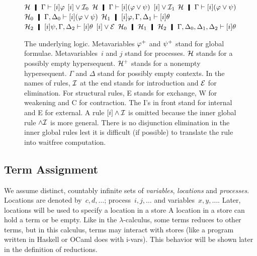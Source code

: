 \begin{figure}
  \UnaryRule
   {$\hyper\hmid\Gamma\vdash[i]\varphi$}
   {$[i]\vee\mathcal I_0$}
   {$\hyper\hmid\Gamma\vdash[i](\varphi\vee\psi)$}
   \hfill
  \UnaryRule{$\hyper\hmid\Gamma\vdash[i]\psi$}
   {$[i]\vee\mathcal I_1$}
   {$\hyper\hmid\Gamma\vdash[i](\varphi\vee\psi)$}
   \TrinaryRule
   {$\hyper_0\hmid\G,\D_0\vdash[i](\phi\vee\psi)$}
   {$\hyper_1\hmid[i]\varphi, \G,\D_1\vdash[i]\theta$}
   {$\hyper_2\hmid[i]\psi,    \G,\D_2\vdash[i]\theta$}
   {$[i]\vee\mathcal E$}
   {$\hyper_0\hmid\hyper_1\hmid\hyper_2\hmid
 \G,\D_0,\D_1,\D_2\vdash[i]\theta$}
\caption[The underlying logic of \lgd.]
 {The underlying logic.
 Metavariables ${\varphi}^+$ and ${\psi}^+$ stand for global formulae.
 Metavariables~$i$ and $j$ stand for processes.
 $\mathcal{H}$ stands for a possibly empty hypersequent.
 $\mathcal{H}^+$ stands for a nonempty hypersequent.
 $\Gamma$ and $\Delta$ stand for possibly empty contexts.
 In the names of rules, $\mathcal I$ at the end stands for introduction and $\mathcal E$ for
 elimination.  For structural rules, E stands for exchange, W for
 weakening and C for contraction.  The I's in front stand for internal and E
 for external.
 A rule $[i]\wedge\mathcal I$ is omitted because the inner global rule
 $\wedge\mathcal I$ is more general.
  There is no disjunction elimination in the inner global rules lest it
 is difficult (if possible) to translate the rule into
 waitfree computation.
 }
\label{fig:logic}
\end{figure}

\subsection{Term Assignment}
\label{term}

We assume distinct, countably infinite sets of \textit{variables},
\textit{locations}
and
\textit{processes}.%
Locations are denoted by~$c,d,\ldots$; process~$i,j, \ldots$ and variables~$x,
y, \ldots$.
Later, locations will be used to specify a location in a store
A location in a store can hold a term or be empty.
Like in the $\lambda$-calculus, some terms reduces to other
terms, but in this calculus, terms may interact with stores (like
a program written in Haskell or OCaml does with i-vars).
This behavior will be shown later in the definition of reductions.

